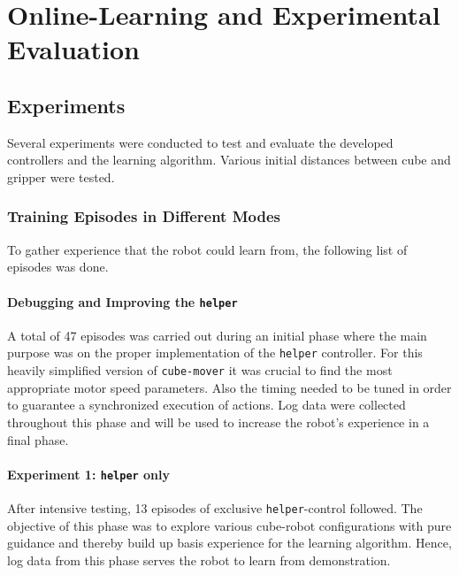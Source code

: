 \chapter{Online-Learning and Experimental Evaluation}

\section{Experiments}
Several experiments were conducted to test and evaluate the developed controllers and the learning algorithm. Various initial distances between cube and gripper were tested.

\subsection{Training Episodes in Different Modes}
To gather experience that the robot could learn from, the following list of episodes was done.


\subsubsection{Debugging and Improving the \texttt{helper}}
A total of 47 episodes was carried out during an initial phase where the main purpose was on the proper implementation of the \texttt{helper} controller. For this heavily simplified version of \texttt{cube-mover} it was crucial to find the most appropriate motor speed parameters. Also the timing needed to be tuned in order to guarantee a synchronized execution of actions. Log data were collected throughout this phase and will be used to increase the robot's experience in a final phase.

\subsubsection{Experiment 1: \texttt{helper} only} 
After intensive testing, 13 episodes of exclusive \texttt{helper}-control followed. The objective of this phase was to explore various cube-robot configurations with pure guidance and thereby build up basis experience for the learning algorithm. Hence, log data from this phase serves the robot to learn from demonstration.

